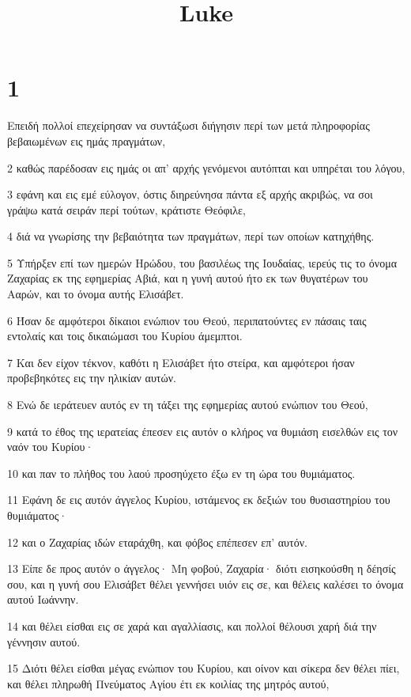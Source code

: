 

\title{Luke}


\chapter{1}

\par Επειδή πολλοί επεχείρησαν να συντάξωσι διήγησιν περί των μετά πληροφορίας βεβαιωμένων εις ημάς πραγμάτων,
\par 2 καθώς παρέδοσαν εις ημάς οι απ' αρχής γενόμενοι αυτόπται και υπηρέται του λόγου,
\par 3 εφάνη και εις εμέ εύλογον, όστις διηρεύνησα πάντα εξ αρχής ακριβώς, να σοι γράψω κατά σειράν περί τούτων, κράτιστε Θεόφιλε,
\par 4 διά να γνωρίσης την βεβαιότητα των πραγμάτων, περί των οποίων κατηχήθης.
\par 5 Υπήρξεν επί των ημερών Ηρώδου, του βασιλέως της Ιουδαίας, ιερεύς τις το όνομα Ζαχαρίας εκ της εφημερίας Αβιά, και η γυνή αυτού ήτο εκ των θυγατέρων του Ααρών, και το όνομα αυτής Ελισάβετ.
\par 6 Ήσαν δε αμφότεροι δίκαιοι ενώπιον του Θεού, περιπατούντες εν πάσαις ταις εντολαίς και τοις δικαιώμασι του Κυρίου άμεμπτοι.
\par 7 Και δεν είχον τέκνον, καθότι η Ελισάβετ ήτο στείρα, και αμφότεροι ήσαν προβεβηκότες εις την ηλικίαν αυτών.
\par 8 Ενώ δε ιεράτευεν αυτός εν τη τάξει της εφημερίας αυτού ενώπιον του Θεού,
\par 9 κατά το έθος της ιερατείας έπεσεν εις αυτόν ο κλήρος να θυμιάση εισελθών εις τον ναόν του Κυρίου·
\par 10 και παν το πλήθος του λαού προσηύχετο έξω εν τη ώρα του θυμιάματος.
\par 11 Εφάνη δε εις αυτόν άγγελος Κυρίου, ιστάμενος εκ δεξιών του θυσιαστηρίου του θυμιάματος·
\par 12 και ο Ζαχαρίας ιδών εταράχθη, και φόβος επέπεσεν επ' αυτόν.
\par 13 Είπε δε προς αυτόν ο άγγελος· Μη φοβού, Ζαχαρία· διότι εισηκούσθη η δέησίς σου, και η γυνή σου Ελισάβετ θέλει γεννήσει υιόν εις σε, και θέλεις καλέσει το όνομα αυτού Ιωάννην.
\par 14 και θέλει είσθαι εις σε χαρά και αγαλλίασις, και πολλοί θέλουσι χαρή διά την γέννησιν αυτού.
\par 15 Διότι θέλει είσθαι μέγας ενώπιον του Κυρίου, και οίνον και σίκερα δεν θέλει πίει, και θέλει πληρωθή Πνεύματος Αγίου έτι εκ κοιλίας της μητρός αυτού,
